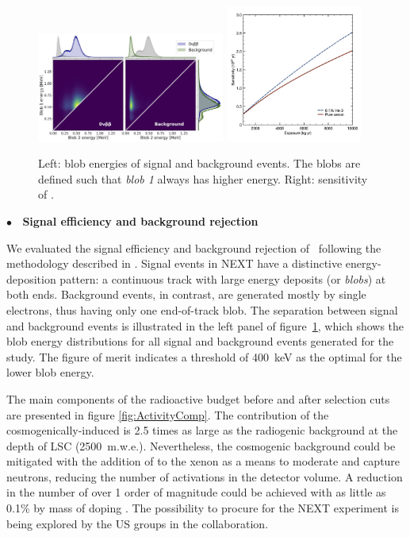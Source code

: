 \begin{figure}
\centering
\includegraphics[width=0.55\textwidth]{img2/BlobComparison.jpg}
\includegraphics[width=0.40\textwidth]{img2/sensitivity_nexthd_lsc.jpg}
\caption{Left: blob energies of signal and background events. The blobs are defined such that \emph{blob 1} always has higher energy. Right: sensitivity of \NHD.}
\label{fig:blobs}
\end{figure}
\indent

{\bf $\bullet$~ Signal efficiency and background rejection}
\label{sec:SimulationAndAnalysis}

\indent
We evaluated the signal efficiency and background rejection of \NHD\ following the methodology described in \cite{Martin-Albo:2015rhw, NEXT:2020amj}. Signal events in NEXT have a distinctive energy-deposition pattern: a continuous track with large energy deposits (or \emph{blobs}) at both ends. Background events, in contrast, are generated mostly by single electrons, thus having only one end-of-track blob. The separation between signal and background events is illustrated in the left panel of figure~\ref{fig:blobs}, which shows the blob energy distributions for all signal and background events generated for the study. The figure of merit indicates a threshold of \SI{400}{\kilo\eV} as the optimal for the lower blob energy.

\indent

The main components of the radioactive budget before and after selection cuts are presented in figure \ref{fig:ActivityComp}. The contribution of the cosmogenically-induced  is 2.5 times as large as the radiogenic background at the depth of LSC (2500~m.w.e.). Nevertheless, the cosmogenic background could be mitigated with the addition of  to the xenon as a means to moderate and capture neutrons, reducing the number of activations in the detector volume. A reduction in the number  of over 1 order of magnitude could be achieved with as little as 0.1\% by mass of  doping \cite{rogers2020mitigation}. The possibility to procure  for the NEXT experiment is being explored by the US groups in the collaboration. 


